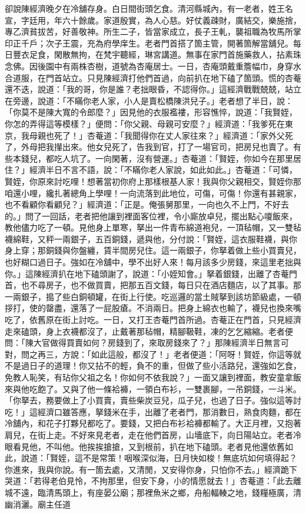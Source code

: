 卻說陳經濟晚夕在冷舖存身。白日間街頭乞食。清河縣城內，有一老者，姓王名宣，字廷用，年六十餘歲。家道殷實，為人心慈。好仗義疎財，廣結交，樂施捨，專乙濟貧拔苦，好善敬神。所生二子，皆當家成立，長子王軋，襲祖職為牧馬所掌印正千戶；次子王震，充為府學庠生。老者門首搭了箇主管，開著箇解當舖兒。每日豐衣足食，閑散無拘，在梵宇聽經，琳宮講道。無事在家門首施藥救人，拈素珠念佛。因後園中有兩株杏樹，道號為杏庵居士。一日，杏庵頭戴重簷幅巾，身穿水合道服，在門首站立。只見陳經濟打他們首過，向前扒在地下磕了箇頭。慌的杏菴還不迭，說道：「我的哥，你是誰？老拙眼昏，不認得你。」這經濟戰戰兢兢，站立在旁邊，說道：「不瞞你老人家，小人是賣松橋陳洪兒子。」老者想了半日，說：「你莫不是陳大寬的令郎麼？」因見他的衣服襤褸，形容憔悴，說道：「我賢姪，你怎的弄得這等模樣？」便問：「你父親、母親可安麼？」經濟道：「我爹死在東京，我母親也死了！」杏菴道：「我聞得你在丈人家往來？」經濟道：「家外父死了，外母把我攆出來。他女兒死了，告我到官，打了一場官司，把房兒也賣了。有些本錢兒，都吃人坑了。一向閑著，沒有營運。」杏菴道：「賢姪，你如今在那里居住？」經濟半日不言不語，說：「不瞞你老人家說，如此如此。」杏菴道：「可憐，賢姪，你原來討吃哩！想著當初你府上那樣根基人家！我與你父親相交，賢姪你那咱還小哩，纔扎著總角上學哩！一向流落到此地位，可傷，可傷！你還有甚親家，也不看顧你看顧兒？」經濟道：「正是。俺張舅那里，一向也久不上門，不好去的。」問了一回話，老者把他讓到裡面客位裡，令小廝放卓兒，擺出點心嗄飯來，教他儘力吃了一頓。見他身上單寒，拏出一件青布綿道袍兒，一頂毡帽，又一雙毡襪綿鞋，又秤一兩銀子，五百銅錢，遞與他，分付說：「賢姪，這衣服鞋襪，與你身上穿；那銅錢與你盤纏，賃半間房兒住。這一兩銀子，你拏着做上些小買賣兒，也好糊口過日子。強如在冷舖中，學不出好人來！每月該多少房錢，來這里老拙與你。」這陳經濟扒在地下磕頭謝了，說道：「小姪知會。」拏着銀錢，出離了杏菴門首，也不尋房子，也不做買賣，把那五百文錢，每日只在酒店麵店，以了其事。那一兩銀子，搗了些白銅頓罐，在街上行使。吃巡邏的當土賊拏到該坊節級處，一頓拶打，使的罄盡，還落了一屁股瘡。不消兩日。把身上綿衣也輸了，襪兒也換來嘴吃了，依舊原在街上討吃。一日，又打王杏菴門首所過。杏菴正在門首，只見經濟走來磕頭，身上衣襪都沒了，止戴著那毡帽，精腳靸鞋，凍的乞乞縮縮。老者便問：「陳大官做得買賣如何？房錢到了，來取房錢來了？」那陳經濟半日無言可對，問之再三，方說：「如此這般，都沒了！」老者便道：「阿呀！賢姪，你這等就不是過日子的道理！你又拈不的輕，負不的重，但做了些小活路兒，還強如乞食，免教人恥笑，有玷你父祖之名！你如何不依我說？」一面又讓到裡面，教安童拿飯來與他吃飽了。又與了他一條袷褲，一領白布衫，一雙裹腳，一吊銅錢，一斗米。「你拏去，務要做上了小買賣，賣些柴炭豆兒，瓜子兒，也過了日子。強似這等討吃！」這經濟口雖答應，拏錢米在手，出離了老者門，那消數日，熟食肉麵，都在冷舖內，和花子打夥兒都吃了。要錢，又把白布衫袷褲都輸了。大正月裡，又抱著肩兒，在街上走。不好來見老者，走在他們首房，山墻底下，向日陽站立。老者冷眼看見他，不叫他。他挨挨搶搶，又到根前，扒在地下磕頭。老者見他還依舊如此，說道：「賢姪，這不是常策！咽喉深似海，日月快如梭！無底坑如何填得起？你進來，我與你說。有一箇去處，又清閒，又安得你身，只怕你不去。」經濟跪下哭道：「若得老伯見怜，不拘那里，但安下身，小的情愿就去！」杏菴道：「此去離城不遠，臨清馬頭上，有座晏公廟；那裡魚米之鄉，舟船輻輳之地，錢糧極廣，清幽消灑。廟主任道